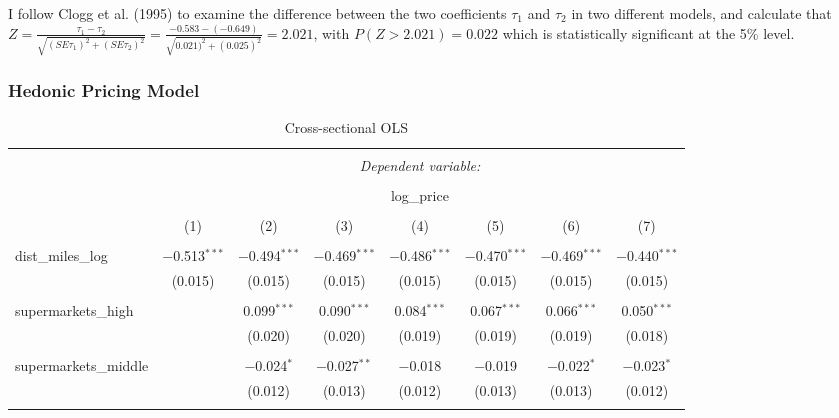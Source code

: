 \documentclass{article}
\begin{document}
I follow Clogg et al. (1995) to examine the difference between the two coefficients $\tau_1$ and $\tau_2$ in two different models, and calculate that $Z = \frac{\tau_1 - \tau_2}{\sqrt{(SE\tau_1)^2 + (SE\tau_2)^2}}  = \frac{-0.583 - (-0.649)}{\sqrt{0.021)^2 + (0.025)^2}} = 2.021$, with $P(Z > 2.021) = 0.022$  which is statistically significant at the 5\% level. 



\subsubsection{Hedonic Pricing Model}

\begin{table}[H] \centering 
  \caption{Cross-sectional OLS} 
  \label{} 
\small 
\begin{tabular}{@{\extracolsep{-10pt}}lccccccc} 
\\[-1.8ex]\hline 
\hline \\[-1.8ex] 
 & \multicolumn{7}{c}{\textit{Dependent variable:}} \\ 
\cline{2-8} 
\\[-1.8ex] & \multicolumn{7}{c}{log\_price} \\ 
\\[-1.8ex] & (1) & (2) & (3) & (4) & (5) & (6) & (7)\\ 
\hline \\[-1.8ex] 
 dist\_miles\_log & $-$0.513$^{***}$ & $-$0.494$^{***}$ & $-$0.469$^{***}$ & $-$0.486$^{***}$ & $-$0.470$^{***}$ & $-$0.469$^{***}$ & $-$0.440$^{***}$ \\ 
  & (0.015) & (0.015) & (0.015) & (0.015) & (0.015) & (0.015) & (0.015) \\ 
  & & & & & & & \\ 
 supermarkets\_high &  & 0.099$^{***}$ & 0.090$^{***}$ & 0.084$^{***}$ & 0.067$^{***}$ & 0.066$^{***}$ & 0.050$^{***}$ \\ 
  &  & (0.020) & (0.020) & (0.019) & (0.019) & (0.019) & (0.018) \\ 
  & & & & & & & \\ 
 supermarkets\_middle &  & $-$0.024$^{*}$ & $-$0.027$^{**}$ & $-$0.018 & $-$0.019 & $-$0.022$^{*}$ & $-$0.023$^{*}$ \\ 
  &  & (0.012) & (0.013) & (0.012) & (0.013) & (0.013) & (0.012) \\ 
  & & & & & & & \\ 

\end{tabular}
\end{table}
\end{document}
